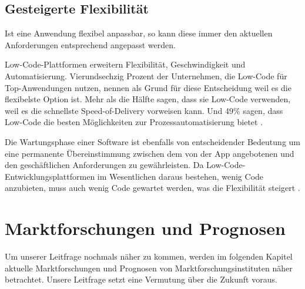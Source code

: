 \documentclass[12pt]{article} %
\begin{document}
	\subsection{Gesteigerte Flexibilität}
	Ist eine Anwendung flexibel anpassbar, so kann diese immer den aktuellen Anforderungen entsprechend angepasst werden.
	
	Low-Code-Plattformen erweitern Flexibilität, Geschwindigkeit und Automatisierung. Vierundsechzig Prozent der Unternehmen, die Low-Code für Top-Anwendungen nutzen, nennen als Grund für diese Entscheidung weil es die flexibelste Option ist. 
	Mehr als die Hälfte sagen, dass sie Low-Code verwenden, weil es die schnellste Speed-of-Delivery vorweisen kann. Und 49\% sagen, dass Low-Code die besten Möglichkeiten zur Prozessautomatisierung bietet \autocite{EmmaVanPelt.2019}. \newline
	
	Die Wartungsphase einer Software ist ebenfalls von entscheidender Bedeutung um eine permanente Übereinstimmung zwischen dem von der App angebotenen und den geschäftlichen Anforderungen zu gewährleisten. Da Low-Code-Entwicklungsplattformen im Wesentlichen daraus bestehen, wenig Code anzubieten, muss auch wenig Code gewartet werden, was die Flexibilität steigert \autocite{Sanchis.2020b}.
	
	


	
	\section{Marktforschungen und Prognosen} \label{Zukunftsaussicht}
	Um unserer Leitfrage nochmals näher zu kommen, werden im folgenden Kapitel aktuelle Marktforschungen und Prognosen von Marktforschungsinstituten näher betrachtet. Unsere Leitfrage setzt eine Vermutung über die Zukunft voraus. \newline
\end{document}
